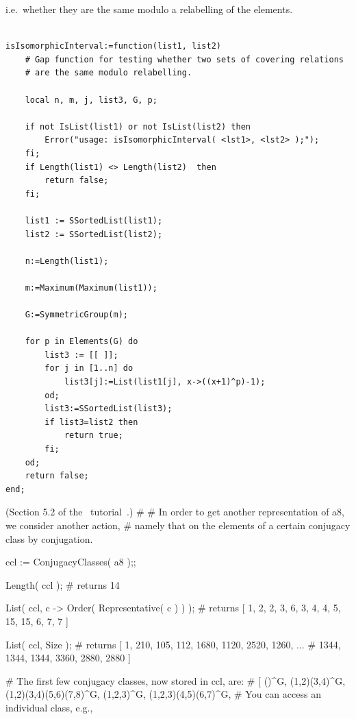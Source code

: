 i.e.~whether they are the same modulo a relabelling of the elements.
{\codesize
\begin{verbatim}

isIsomorphicInterval:=function(list1, list2)
    # Gap function for testing whether two sets of covering relations 
    # are the same modulo relabelling. 
    
    local n, m, j, list3, G, p;
    
    if not IsList(list1) or not IsList(list2) then
        Error("usage: isIsomorphicInterval( <lst1>, <lst2> );");
    fi;
    if Length(list1) <> Length(list2)  then
        return false;
    fi;
        
    list1 := SSortedList(list1);
    list2 := SSortedList(list2);

    n:=Length(list1);
    
    m:=Maximum(Maximum(list1));
  
    G:=SymmetricGroup(m);
    
    for p in Elements(G) do
        list3 := [[ ]];
        for j in [1..n] do
            list3[j]:=List(list1[j], x->((x+1)^p)-1); 
        od;
        list3:=SSortedList(list3);
        if list3=list2 then
            return true;
        fi;
    od;
    return false;
end;

\end{verbatim}}

\clearpage

\printbibliography














(Section 5.2 of the \gap\ tutorial~\cite{gaptutorial}.)
#
# In order to get another representation of a8, we consider another action, 
# namely that on the elements of a certain conjugacy class by conjugation.

ccl := ConjugacyClasses( a8 );;

Length( ccl );  # returns 14

List( ccl, c -> Order( Representative( c ) ) );
# returns [ 1, 2, 2, 3, 6, 3, 4, 4, 5, 15, 15, 6, 7, 7 ]

List( ccl, Size );
# returns [ 1, 210, 105, 112, 1680, 1120, 2520, 1260, ...
#                     1344, 1344, 1344, 3360, 2880, 2880 ]

# The first few conjugacy classes, now stored in ccl, are:
# [ ()^G, (1,2)(3,4)^G, (1,2)(3,4)(5,6)(7,8)^G, (1,2,3)^G, (1,2,3)(4,5)(6,7)^G,
# You can access an individual class, e.g.,

